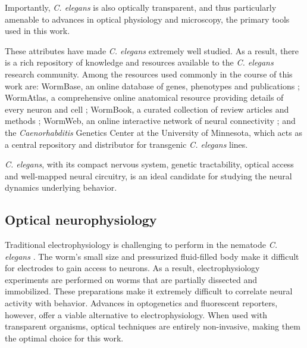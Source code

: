 Importantly, \textit{C. elegans} is also optically transparent, and thus particularly amenable to advances in optical physiology and microscopy,  the primary tools used in this work. 

These attributes have made  \textit{C. elegans}  extremely well studied.  As a result, there is a rich repository of knowledge and resources available to the \textit{C. elegans} research community. Among the resources used commonly in the course of this work are:  WormBase, an online database of genes, phenotypes and publications \citep{harris_wormbase:_2010}; WormAtlas, a comprehensive online anatomical resource providing details of every neuron and cell \citep{altun_wormatlas_2002}; WormBook, a curated collection of review articles and methods \citep{the_c._elegans_research_community_wormbook_2011}; WormWeb, an online interactive network of neural connectivity \citep{bhatla_c._2009};  and the \textit{Caenorhabditis} Genetics Center at the University of Minnesota, which acts as a central repository and distributor for transgenic \textit{C. elegans} lines.


\textit{C. elegans}, with its compact nervous system, genetic tractability,  optical access and well-mapped neural circuitry, is an ideal candidate for studying the neural dynamics underlying behavior.

\subsection{Optical neurophysiology}
Traditional electrophysiology is challenging to perform in the nematode \textit{C. elegans} \citep{goodman_active_1998, schafer_neurophysiological_2006}. The worm's small size and pressurized fluid-filled body make it difficult for electrodes to gain access to neurons.  As a result, electrophysiology experiments are  performed on worms that are partially dissected and immobilized. These preparations make it extremely difficult to correlate neural activity with behavior.  Advances in optogenetics and fluorescent reporters, however,  offer a viable alternative to electrophysiology. When used with transparent organisms, optical techniques are entirely non-invasive, making them the optimal choice for this work. 

